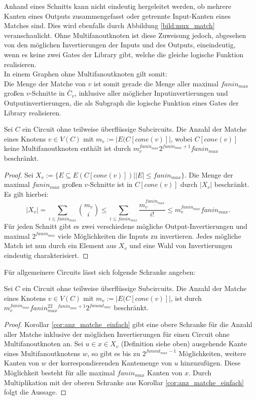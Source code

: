 \documentclass[11pt, a4paper, german]{article}
\begin{document}
Anhand eines Schnitts kann nicht eindeutig hergeleitet werden, ob mehrere Kanten eines Outputs zusammengefasst oder getrennte Input-Kanten eines Matches sind. Dies wird ebenfalls durch Abbildung \ref{bild:mux_match} veranschaulicht. Ohne Multifanoutknoten ist diese Zuweisung jedoch, abgesehen von den möglichen Invertierungen der Inputs und des Outputs, eineindeutig, wenn es keine zwei Gates der Library gibt, welche die gleiche  logische Funktion realisieren.\\
In einem Graphen ohne Multifanoutknoten gilt somit: \\
Die Menge der Matche von $v$ ist somit gerade die Menge aller maximal $fanin_{max}$ großen $v$-Schnitte in $\bar{C}_v$, inklusive aller möglicher Inputinvertierungen und Outputinvertierungen, die als Subgraph die logische Funktion eines Gates der Library realisieren.
\begin{cor}\label{cor:anz_matche_einfach}
Sei $C$ ein Circuit ohne teilweise überflüssige Subcircuits. Die Anzahl der Matche eines Knotens $v\in V(C)$ mit $m_v := |E(C[cone(v)]|$, wobei $C[cone(v)]$ keine Multifanoutknoten enthält ist durch $m_v^{fanin_{max}} 2^{fanin_{max}+1} fanin_{max}$ beschränkt.
\end{cor}
\begin{proof}
Sei  $X_v:= \{ E \subseteq E(C[cone(v)]) | |E|\leq fanin_{max}  \}$. Die Menge der maximal $fanin_{max}$ großen $v$-Schnitte ist in $C[cone(v)]$ durch $ |X_v|$ beschränkt. Es gilt hierbei:
\[ |X_v| =\sum\limits_{i \leq fanin_{max}} \binom{m_v}{i} \leq  \sum\limits_{i \leq fanin_{max}}\dfrac{m_v^{\underline{fanin_{max}}}}{i!} \leq m_v^{fanin_{max}} fanin_{max} .\]
Für jeden Schnitt gibt es zwei verschiedene mögliche Output-Invertierungen und maximal  $2^{fanin_{max}}$ viele Möglichkeiten die Inputs zu invertieren. Jedes mögliche Match ist nun durch ein Element aus $X_v$ und eine Wahl von Invertierungen eindeutig charakterisiert.
\end{proof}
Für allgemeinere Circuits lässt sich folgende Schranke angeben: 
\begin{cor}\label{cor:anzahl_matche_bel}
Sei $C$ ein Circuit ohne teilweise überflüssige Subcircuits. Die Anzahl der Matche eines Knotens $v\in V(C)$ mit $m_v := |E(C[cone(v)]|$, ist durch \\ $m_v^{fanin_{max}} fanin_{max}^22^{fanin_{max}+1}2^{fanout_{max}}$ beschränkt.
\end{cor}
\begin{proof}
Korollar \ref{cor:anz_matche_einfach} gibt eine obere Schranke für die Anzahl aller Matche inklusive der möglichen Invertierungen für einen Circuit ohne Multifanoutknoten an. Sei $u \in x \in X_v$ (Definition siehe oben) ausgehende Kante eines Multifanoutknotens $w$, so gibt es bis zu $2^{fanout_{max}-1}$ Möglichkeiten, weitere Kanten von $w$ der korrespondierenden Kantemenge von $u$ hinzuzufügen.  Diese Möglichkeit besteht für alle maximal $fanin_{max}$ Kanten von $x$. Durch Multiplikation mit der oberen Schranke aus Korollar \ref{cor:anz_matche_einfach} folgt die Aussage.
\end{proof}
\end{document}
